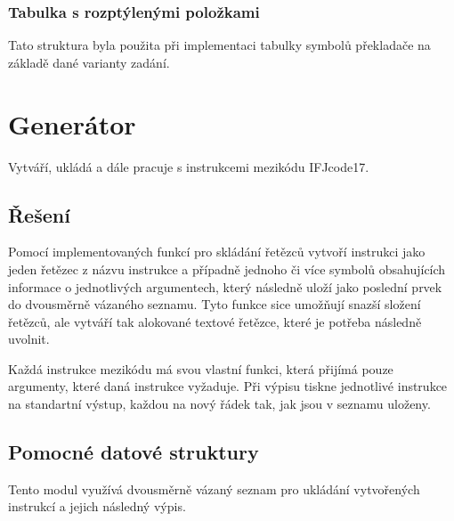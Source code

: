 \documentclass[a4paper,11pt]{article}
\begin{document}
\subsubsection{Tabulka s rozptýlenými položkami} \label{syse-struktury-tabulka}
Tato struktura byla použita při implementaci tabulky symbolů překladače na základě dané varianty zadání.


\newpage
\section{Generátor} \label{gen}
Vytváří, ukládá a dále pracuje s instrukcemi mezikódu IFJcode17.

\subsection{Řešení} \label{gen-reseni}
Pomocí implementovaných funkcí pro skládání řetězců vytvoří instrukci jako jeden řetězec z názvu instrukce a případně jednoho či více symbolů obsahujících informace o jednotlivých argumentech, který následně uloží jako poslední prvek do dvousměrně vázaného seznamu. Tyto funkce sice umožňují snazší složení řetězců, ale vytváří tak alokované textové řetězce, které je potřeba následně uvolnit.

\vspace{2mm}
Každá instrukce mezikódu má svou vlastní funkci, která přijímá pouze argumenty, které daná instrukce vyžaduje. Při výpisu tiskne jednotlivé instrukce na standartní výstup, každou na nový řádek tak, jak jsou v seznamu uloženy.

\subsection{Pomocné datové struktury} \label{gen-struktury}
Tento modul využívá dvousměrně vázaný seznam pro ukládání vytvořených instrukcí a jejich následný výpis.

	
\end{document}
